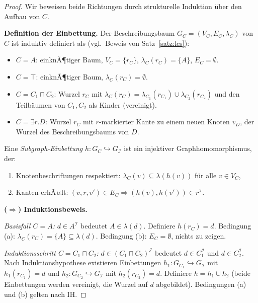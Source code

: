 ﻿\documentclass[a4paper,12pt]{article}
\theoremstyle{definition}
\theoremstyle{plain}
\theoremstyle{remark}
\newcommand{\interp}[1]{\ensuremath{\mathcal{#1}}}
\begin{document}
\begin{proof}
Wir beweisen beide Richtungen durch strukturelle Induktion
{\"u}ber den Aufbau von $C$.

\textbf{Definition der Einbettung.}
Der Beschreibungsbaum $G_C = (V_C, E_C, \lambda_C)$ von $C$
ist induktiv definiert als (vgl.\ Beweis von Satz~\ref{satz:lcs}):
\begin{itemize}
  \item $C = A$: einknÃ¶tiger Baum, $V_C = \{r_C\}$,
        $\lambda_C(r_C) = \{A\}$, $E_C = \emptyset$.
  \item $C = \top$: einknÃ¶tiger Baum, $\lambda_C(r_C) = \emptyset$.
  \item $C = C_1 \sqcap C_2$: Wurzel $r_C$ mit
        $\lambda_C(r_C) = \lambda_{C_1}(r_{C_1}) \cup \lambda_{C_2}(r_{C_2})$
        und den Teilb{\"a}umen von $C_1, C_2$ als Kinder (vereinigt).
  \item $C = \exists r.D$: Wurzel $r_C$ mit $r$-markierter
        Kante zu einem neuen Knoten $v_D$, der Wurzel des
        Beschreibungsbaums von $D$.
\end{itemize}

Eine \emph{Subgraph-Einbettung} $h: G_C \hookrightarrow G_\interp{I}$
ist ein injektiver Graphhomomorphismus, der:
\begin{enumerate}[label=(\alph*)]
  \item Knotenbeschriftungen respektiert:
        $\lambda_C(v) \subseteq \lambda(h(v))$ f{\"u}r alle $v \in V_C$,
  \item Kanten erhÃ¤lt:
        $(v, r, v') \in E_C \Rightarrow (h(v), h(v')) \in r^\interp{I}$.
\end{enumerate}

\textbf{($\Rightarrow$) Induktionsbeweis.}

\emph{Basisfall $C = A$:}
$d \in A^\interp{I}$ bedeutet $A \in \lambda(d)$.
Definiere $h(r_C) = d$.
Bedingung (a): $\lambda_C(r_C) = \{A\} \subseteq \lambda(d)$. \checkmark
Bedingung (b): $E_C = \emptyset$, nichts zu zeigen. \checkmark

\emph{Induktionsschritt $C = C_1 \sqcap C_2$:}
$d \in (C_1 \sqcap C_2)^\interp{I}$ bedeutet $d \in C_1^\interp{I}$
und $d \in C_2^\interp{I}$.
Nach Induktionshypothese existieren Einbettungen
$h_1: G_{C_1} \hookrightarrow G_\interp{I}$ mit $h_1(r_{C_1}) = d$
und $h_2: G_{C_2} \hookrightarrow G_\interp{I}$ mit $h_2(r_{C_2}) = d$.
Definiere $h = h_1 \cup h_2$ (beide Einbettungen werden vereinigt,
die Wurzel auf $d$ abgebildet). Bedingungen (a) und (b) gelten nach IH. \checkmark


\end{proof}
\end{document}
